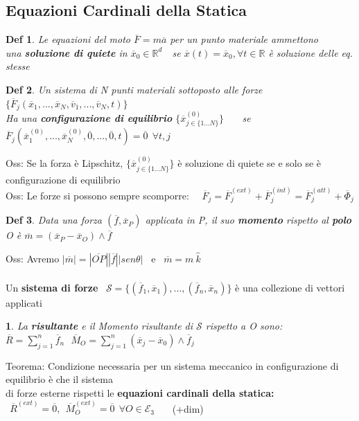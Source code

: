 \documentclass{article}
\theoremstyle{unnumbered}
\newtheorem* {theoremT}{Def}
\theoremstyle{unnumbered1}
\newtheorem* {theoremT1}{}
\newenvironment{defi}{\begin{gBox}\begin{theoremT}}{\end{theoremT}\end{gBox}}
\newenvironment{Ndefi}{\begin{gBox}\begin{theoremT1}}{\end{theoremT1}\end{gBox}}
\begin{document}
\subsection{Equazioni Cardinali della Statica}
%
\begin{defi}
Le equazioni del moto $\overline{F}=m\overline{a}$ per un punto materiale ammettono\\ una \textbf{soluzione di quiete} in $\overline{x}_0\in\mathbb{R}^d$\ \
se $\overline{x}(t)=\overline{x}_0, \forall t \in \mathbb{R}$ è soluzione delle eq. stesse
\end{defi}
%
\begin{defi}
Un sistema di N punti materiali sottoposto alle forze $\{\overline{F}_j(\overline{x}_1,...,\overline{x}_N,\overline{v}_1,...,\overline{v}_N,t)\}$\\
Ha una \textbf{configurazione di equilibrio} $\{\overline{x}_{j\in\{1...N\}}^{(0)}\}$ \ \ \ se \
$\overline{F}_j(\overline{x}_1^{(0)},...,\overline{x}_N^{(0)},\overline{0},...,\overline{0},t)=\overline{0} \ \ \forall t,j$
\end{defi}
%
Oss: Se la forza è Lipschitz, $\{\overline{x}_{j\in\{1...N\}}^{(0)}\}$ è soluzione di quiete se e solo se è configurazione di equilibrio \\
Oss: Le forze si possono sempre scomporre: \ \
$\overline{F}_j=\overline{F}_j^{(ext)}+\overline{F}_j^{(int)}=\overline{F}_j^{(att)}+\overline{\Phi}_j$ \\
%
%
%
\begin{defi}
Data una forza $(\overline{f},\overline{x}_P)$ applicata in P, il suo \textbf{momento} rispetto al \textbf{polo} O è $\overline{m}=(\overline{x}_P-\overline{x}_O)\wedge\overline{f}$
\end{defi}
Oss: Avremo $|\overline{m}|= |\overline{OP}||\overline{f}||sen\theta|$ \ e \ $\overline{m}=m \ \hat{k}$\\ \\
%
Un \textbf{sistema di forze} \ $\mathcal{S}=\{(\overline{f}_1,\overline{x}_1),...,(\overline{f}_n,\overline{x}_n)\}$ è una collezione di vettori applicati
\begin{Ndefi}
La \textbf{risultante} e il Momento risultante di $\mathcal{S}$ rispetto a O sono: \ \ $\overline{R}=\sum_{j=1}^n\overline{f}_n \ \ \ \overline{M}_O=\sum^n_{j=1}(\overline{x}_j-\overline{x}_0)\wedge\overline{f}_j$
\end{Ndefi}
%
%
Teorema: Condizione necessaria per un sistema meccanico in configurazione di equilibrio è che il sistema \\ \phantom{\ } di forze esterne rispetti le \textbf{equazioni cardinali della statica:} $\ \ \overline{R}^{(ext)}=\overline{0}, \ \ \overline{M}_O^{(ext)}=\overline{0} \ \ \forall O \in \mathcal{E}_3$ \ \ \ (+dim)\\
\end{document}
